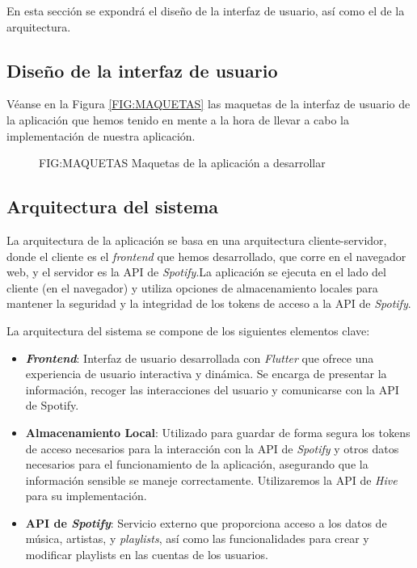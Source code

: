 En esta sección se expondrá el diseño de la interfaz de usuario, así como el de la arquitectura.

\subsection{Diseño de la interfaz de usuario\label{SEC:DISENO_INTERFAZ}}

Véanse en la Figura \ref{FIG:MAQUETAS} las maquetas de la interfaz de usuario de la aplicación que hemos tenido en mente a la hora de llevar a cabo
la implementación de nuestra aplicación.

\begin{figure}[Maquetas de la aplicación a desarrollar]{FIG:MAQUETAS}
    {Maquetas de la aplicación a desarrollar}
\end{figure}


\subsection{Arquitectura del sistema\label{SEC:DISENO_ARQUITECTURA}}

La arquitectura de la aplicación se basa en una arquitectura cliente-servidor, donde el cliente es el \textit{frontend} que hemos desarrollado, que corre en el navegador web, y 
el servidor es la API de \textit{Spotify}.La aplicación se ejecuta en el lado del cliente (en el navegador) y utiliza opciones de almacenamiento locales para mantener la seguridad y 
la integridad de los tokens de acceso a la API de \textit{Spotify}. 

La arquitectura del sistema se compone de los siguientes elementos clave:

\begin{itemize}
    \item \textbf{\textit{Frontend}}: Interfaz de usuario desarrollada con \textit{Flutter} que ofrece una experiencia de usuario interactiva 
    y dinámica. Se encarga de presentar la información, recoger las interacciones del usuario y comunicarse con la API de Spotify.
    \item \textbf{Almacenamiento Local}: Utilizado para guardar de forma segura los tokens de acceso necesarios para la interacción con la API de \textit{Spotify}
    y otros datos necesarios para el funcionamiento de la aplicación, asegurando que la información sensible se maneje correctamente. Utilizaremos
    la API de \textit{Hive} \cite{hive} para su implementación.
    \item \textbf{API de \textit{Spotify}}: Servicio externo que proporciona acceso a los datos de música, artistas, y \textit{playlists}, así como las funcionalidades 
    para crear y modificar playlists en las cuentas de los usuarios.
\end{itemize}

